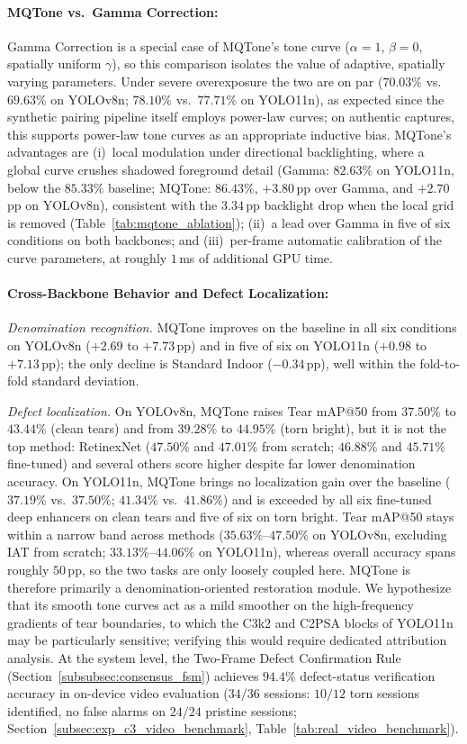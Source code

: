 \documentclass[final,5p,times,twocolumn,authoryear]{elsarticle}
\begin{document}
\paragraph{MQTone vs.\ Gamma Correction:}
Gamma Correction is a special case of MQTone's tone curve ($\alpha = 1$, $\beta = 0$, spatially uniform $\gamma$), so this comparison isolates the value of adaptive, spatially varying parameters. Under severe overexposure the two are on par ($70.03\%$ vs.\ $69.63\%$ on YOLOv8n; $78.10\%$ vs.\ $77.71\%$ on YOLO11n), as expected since the synthetic pairing pipeline itself employs power-law curves; on authentic captures, this supports power-law tone curves as an appropriate inductive bias. MQTone's advantages are (i)~local modulation under directional backlighting, where a global curve crushes shadowed foreground detail (Gamma: $82.63\%$ on YOLO11n, below the $85.33\%$ baseline; MQTone: $86.43\%$, $+3.80$\,pp over Gamma, and $+2.70$\,pp on YOLOv8n), consistent with the $3.34$\,pp backlight drop when the local grid is removed (Table~\ref{tab:mqtone_ablation}); (ii)~a lead over Gamma in five of six conditions on both backbones; and (iii)~per-frame automatic calibration of the curve parameters, at roughly $1$\,ms of additional GPU time.

\paragraph{Cross-Backbone Behavior and Defect Localization:}
\emph{Denomination recognition.} MQTone improves on the baseline in all six conditions on YOLOv8n ($+2.69$ to $+7.73$\,pp) and in five of six on YOLO11n ($+0.98$ to $+7.13$\,pp); the only decline is Standard Indoor ($-0.34$\,pp), well within the fold-to-fold standard deviation.

\emph{Defect localization.} On YOLOv8n, MQTone raises Tear mAP@50 from $37.50\%$ to $43.44\%$ (clean tears) and from $39.28\%$ to $44.95\%$ (torn bright), but it is not the top method: RetinexNet ($47.50\%$ and $47.01\%$ from scratch; $46.88\%$ and $45.71\%$ fine-tuned) and several others score higher despite far lower denomination accuracy. On YOLO11n, MQTone brings no localization gain over the baseline ($37.19\%$ vs.\ $37.50\%$; $41.34\%$ vs.\ $41.86\%$) and is exceeded by all six fine-tuned deep enhancers on clean tears and five of six on torn bright. Tear mAP@50 stays within a narrow band across methods ($35.63\%$--$47.50\%$ on YOLOv8n, excluding IAT from scratch; $33.13\%$--$44.06\%$ on YOLO11n), whereas overall accuracy spans roughly $50$\,pp, so the two tasks are only loosely coupled here. MQTone is therefore primarily a denomination-oriented restoration module. We hypothesize that its smooth tone curves act as a mild smoother on the high-frequency gradients of tear boundaries, to which the C3k2 and C2PSA blocks of YOLO11n may be particularly sensitive; verifying this would require dedicated attribution analysis. At the system level, the Two-Frame Defect Confirmation Rule (Section~\ref{subsubsec:consensus_fsm}) achieves $94.4\%$ defect-status verification accuracy in on-device video evaluation ($34/36$ sessions: $10/12$ torn sessions identified, no false alarms on $24/24$ pristine sessions; Section~\ref{subsec:exp_c3_video_benchmark}, Table~\ref{tab:real_video_benchmark}).
\end{document}

